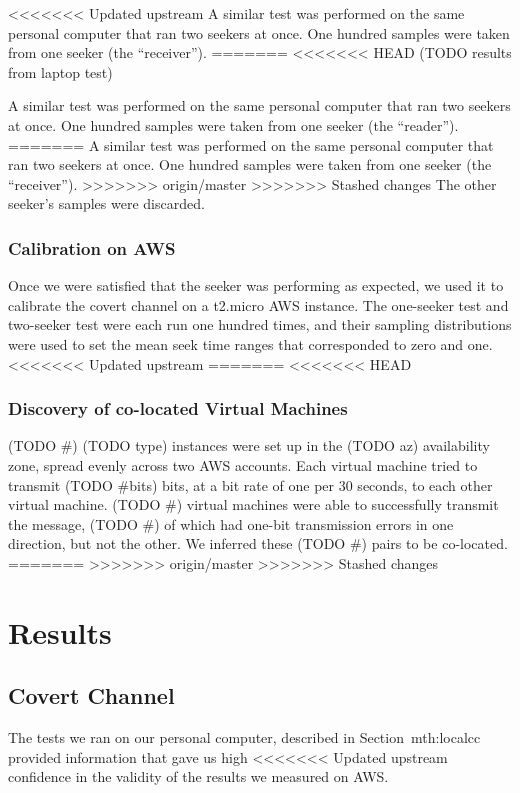 \documentclass[conference]{IEEEtran}
\begin{document}
<<<<<<< Updated upstream
A similar test was performed on the same personal computer that ran two seekers at once.
One hundred samples were taken from one seeker (the ``receiver'').
=======
<<<<<<< HEAD
(TODO results from laptop test)

A similar test was performed on the same personal computer that ran two seekers at once.
One hundred samples were taken from one seeker (the ``reader'').
=======
A similar test was performed on the same personal computer that ran two seekers at once.
One hundred samples were taken from one seeker (the ``receiver'').
>>>>>>> origin/master
>>>>>>> Stashed changes
The other seeker's samples were discarded.

\subsubsection{Calibration on AWS}
Once we were satisfied that the seeker was performing as expected, we used it to calibrate the covert channel on a
  t2.micro AWS instance.
The one-seeker test and two-seeker test were each run one hundred times, and their sampling distributions were
  used to set the mean seek time ranges that corresponded to zero and one.
<<<<<<< Updated upstream
=======
<<<<<<< HEAD

\subsubsection{Discovery of co-located Virtual Machines}
(TODO \#) (TODO type) instances were set up in the (TODO az) availability zone, spread evenly across two AWS accounts.
Each virtual machine tried to transmit (TODO \#bits) bits, at a bit rate of one per 30 seconds, to each other virtual
  machine.
(TODO \#) virtual machines were able to successfully transmit the message, (TODO \#) of which had one-bit transmission
  errors in one direction, but not the other.
We inferred these (TODO \#) pairs to be co-located.
=======
>>>>>>> origin/master
>>>>>>> Stashed changes

\section{Results}
\subsection{Covert Channel}
The tests we ran on our personal computer, described in Section~{mth:localcc} provided information that gave us high
<<<<<<< Updated upstream
  confidence in the validity of the results we measured on AWS.
\end{document}
